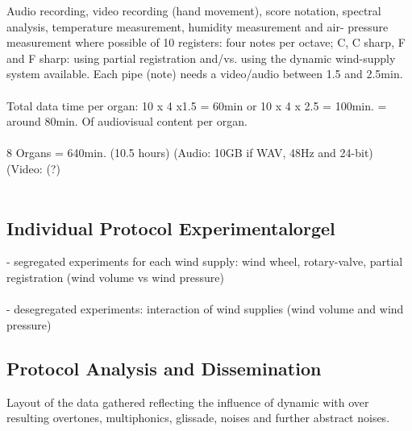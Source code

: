 Audio recording, video recording (hand movement), score notation, spectral analysis, temperature measurement, humidity measurement and air- pressure measurement where possible  of 10 registers: four notes per octave; C, C sharp, F and F sharp: using partial registration and/vs. using the dynamic wind-supply system available.
Each pipe (note) needs a video/audio between 1.5 and 2.5min. \\
\\
Total data time per organ: 10 x 4 x1.5 = 60min or 10 x 4 x 2.5 = 100min. = around 80min. Of audiovisual content per organ. \\
\\
8 Organs = 640min. (10.5 hours) (Audio: 10GB if WAV, 48Hz and 24-bit) (Video: (?)\\
\\
\subsection{Individual Protocol Experimentalorgel}

- segregated experiments for each wind supply: wind wheel, rotary-valve, partial registration (wind volume vs wind pressure)\\
\\
- desegregated experiments: interaction of wind supplies (wind volume and wind pressure)

\subsection{Protocol Analysis and Dissemination}

Layout of the data gathered reflecting the influence of dynamic with over resulting overtones, multiphonics, glissade, noises and further  abstract noises. 



